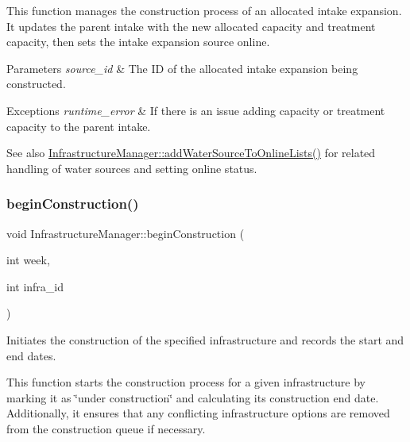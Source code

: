 This function manages the construction process of an allocated intake expansion. It updates the parent intake with the new allocated capacity and treatment capacity, then sets the intake expansion source online.


\begin{DoxyParams}{Parameters}
{\em source\+\_\+id} & The ID of the allocated intake expansion being constructed.\\
\hline
\end{DoxyParams}

\begin{DoxyExceptions}{Exceptions}
{\em runtime\+\_\+error} & If there is an issue adding capacity or treatment capacity to the parent intake.\\
\hline
\end{DoxyExceptions}
\begin{DoxySeeAlso}{See also}
\mbox{\hyperlink{classInfrastructureManager_ab66bdc91a6f60c6aea6ce0bf179df913}{Infrastructure\+Manager\+::add\+Water\+Source\+To\+Online\+Lists()}} for related handling of water sources and setting online status. 
\end{DoxySeeAlso}
\mbox{\label{classInfrastructureManager_a7d60e4abff73890519ced487c74f2675}} 
\subsubsection{\texorpdfstring{begin\+Construction()}{beginConstruction()}}
{\footnotesize\ttfamily void Infrastructure\+Manager\+::begin\+Construction (\begin{DoxyParamCaption}\item[{int}]{week,  }\item[{int}]{infra\+\_\+id }\end{DoxyParamCaption})}



Initiates the construction of the specified infrastructure and records the start and end dates. 

This function starts the construction process for a given infrastructure by marking it as \char`\"{}under construction\char`\"{} and calculating its construction end date. Additionally, it ensures that any conflicting infrastructure options are removed from the construction queue if necessary.


